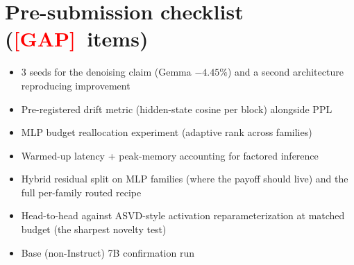 \documentclass[11pt]{article}
\newcommand{\gap}{\textcolor{red}{[GAP]}}
\begin{document}
\section*{Pre-submission checklist (\gap\ items)}
\begin{itemize}[leftmargin=1.5em]
  \item 3 seeds for the denoising claim (Gemma $-4.45\%$) and a second
    architecture reproducing improvement
  \item Pre-registered drift metric (hidden-state cosine per block)
    alongside PPL
  \item MLP budget reallocation experiment (adaptive rank across families)
  \item Warmed-up latency + peak-memory accounting for factored inference
  \item Hybrid residual split on MLP families (where the payoff should
    live) and the full per-family routed recipe
  \item Head-to-head against ASVD-style activation reparameterization at
    matched budget (the sharpest novelty test)
  \item Base (non-Instruct) 7B confirmation run
\end{itemize}
\end{document}
